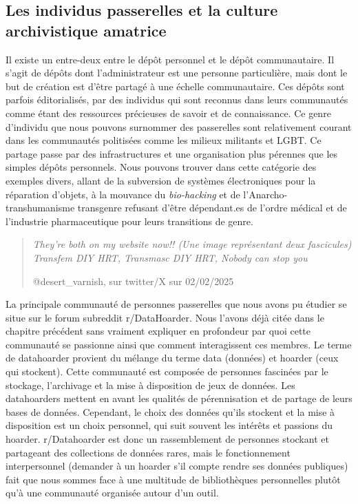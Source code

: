 \subsection*{Les individus \og passerelles \fg et la culture archivistique amatrice}

Il existe un entre-deux entre le dépôt personnel et le dépôt communautaire. Il s'agit de dépôts dont l'administrateur est une personne particulière, mais dont le but de création est d'être partagé à une échelle communautaire. Ces dépôts sont parfois éditorialisés, par des individus qui sont reconnus dans leurs communautés comme étant des ressources précieuses de savoir et de connaissance. Ce genre d'individu que nous pouvons surnommer des \og passerelles \fg sont relativement courant dans les communautés politisées comme les milieux militants et LGBT. Ce partage passe par des infrastructures et une organisation plus pérennes que les simples dépôts personnels. Nous pouvons trouver dans cette catégorie des exemples divers, allant de la subversion de systèmes électroniques pour la réparation d'objets, à la mouvance du \textit{bio-hacking} et de l'Anarcho-transhumanisme transgenre refusant d'être dépendant.es de l'ordre médical et de l'industrie pharmaceutique pour leurs transitions de genre. 

\begin{quote}
    \textit{They're both on my website now!! (Une image représentant deux fascicules) Transfem DIY HRT, Transmasc DIY HRT, Nobody can stop you}

    @desert\_varnish, sur twitter/X sur 02/02/2025
\end{quote}

La principale communauté de personnes \og passerelles \fg que nous avons pu étudier se situe sur le forum subreddit r/DataHoarder. Nous l'avons déjà citée dans le chapitre précédent sans vraiment expliquer en profondeur par quoi cette communauté se passionne ainsi que comment interagissent ces membres. Le terme de datahoarder provient du mélange du terme data (données) et hoarder (ceux qui stockent). Cette communauté est composée de personnes fascinées par le stockage, l'archivage et la mise à disposition de jeux de données. Les datahoarders mettent en avant les qualités de pérennisation et de partage de leurs bases de données. Cependant, le choix des données qu'ils stockent et la mise à disposition est un choix personnel, qui suit souvent les intérêts et passions du hoarder. r/Datahoarder est donc un rassemblement de personnes stockant et partageant des collections de données rares, mais le fonctionnement interpersonnel (demander à un hoarder s'il compte rendre ses données publiques) fait que nous sommes face à une multitude de bibliothèques personnelles plutôt qu'à une communauté organisée autour d'un outil.

